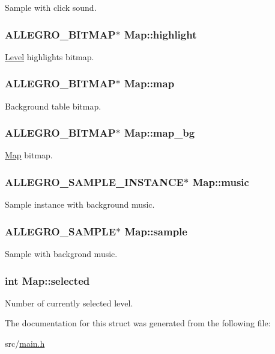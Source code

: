 Sample with click sound. \hypertarget{structMap_a703b41e358b7c8ff39bf0d8dd37bb408}{
\subsubsection[{highlight}]{\setlength{\rightskip}{0pt plus 5cm}A\-L\-L\-E\-G\-R\-O\-\_\-\-B\-I\-T\-M\-A\-P$\ast$ Map\-::highlight}}\label{structMap_a703b41e358b7c8ff39bf0d8dd37bb408}
\hyperlink{structLevel}{Level} highlights bitmap. \hypertarget{structMap_abaf70186fbb2b4b047b8350e3ec5347c}{
\subsubsection[{map}]{\setlength{\rightskip}{0pt plus 5cm}A\-L\-L\-E\-G\-R\-O\-\_\-\-B\-I\-T\-M\-A\-P$\ast$ Map\-::map}}\label{structMap_abaf70186fbb2b4b047b8350e3ec5347c}
Background table bitmap. \hypertarget{structMap_ac0b084971832b4466a9d91233452378d}{
\subsubsection[{map\-\_\-bg}]{\setlength{\rightskip}{0pt plus 5cm}A\-L\-L\-E\-G\-R\-O\-\_\-\-B\-I\-T\-M\-A\-P$\ast$ Map\-::map\-\_\-bg}}\label{structMap_ac0b084971832b4466a9d91233452378d}
\hyperlink{structMap}{Map} bitmap. \hypertarget{structMap_a17ae4f61c1209816b26940d1c8a88f68}{
\subsubsection[{music}]{\setlength{\rightskip}{0pt plus 5cm}A\-L\-L\-E\-G\-R\-O\-\_\-\-S\-A\-M\-P\-L\-E\-\_\-\-I\-N\-S\-T\-A\-N\-C\-E$\ast$ Map\-::music}}\label{structMap_a17ae4f61c1209816b26940d1c8a88f68}
Sample instance with background music. \hypertarget{structMap_a3334bc47109df8757b77c9d3bf67ec5f}{
\subsubsection[{sample}]{\setlength{\rightskip}{0pt plus 5cm}A\-L\-L\-E\-G\-R\-O\-\_\-\-S\-A\-M\-P\-L\-E$\ast$ Map\-::sample}}\label{structMap_a3334bc47109df8757b77c9d3bf67ec5f}
Sample with backgrond music. \hypertarget{structMap_a07b3269191a003d517977da3adc7f0a4}{
\subsubsection[{selected}]{\setlength{\rightskip}{0pt plus 5cm}int Map\-::selected}}\label{structMap_a07b3269191a003d517977da3adc7f0a4}
Number of currently selected level. 

The documentation for this struct was generated from the following file\-:\begin{DoxyCompactItemize}
\item 
src/\hyperlink{main_8h}{main.\-h}\end{DoxyCompactItemize}

